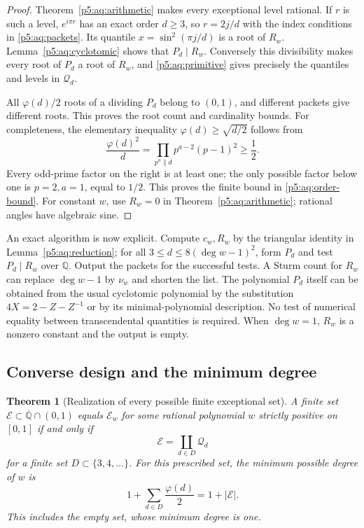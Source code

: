 \documentclass[11pt,a4paper]{article}
\newtheorem{theorem}{Theorem}[section]
\theoremstyle{definition}
\theoremstyle{remark}
\numberwithin{equation}{section}
\begin{document}
\begin{proof}
Theorem~\ref{p5:aq:arithmetic} makes every exceptional level rational.
If $r$ is such a level, $e^{i\pi r}$ has an exact order
$d\ge3$, so $r=2j/d$ with the index conditions in
\eqref{p5:aq:packets}. Its quantile
$x=\sin^2(\pi j/d)$ is a root of $R_w$.
Lemma~\ref{p5:aq:cyclotomic} shows that $P_d\mid R_w$.
Conversely this divisibility makes every root of $P_d$
a root of $R_w$, and \eqref{p5:aq:primitive} gives precisely
the quantiles and levels in $\mathcal Q_d$.

All $\varphi(d)/2$ roots of a dividing $P_d$ belong to $(0,1)$,
and different packets give different roots. This proves the
root count and cardinality bounds.
For completeness, the elementary inequality
$\varphi(d)\ge\sqrt{d/2}$ follows from
\[
 \frac{\varphi(d)^2}{d}
   =\prod_{p^a\parallel d}p^{a-2}(p-1)^2\ge\frac12.
\]
Every odd-prime factor on the right is at least one; the only
possible factor below one is $p=2,a=1$, equal to $1/2$.
This proves the finite bound in \eqref{p5:aq:order-bound}.
For constant $w$, use $R_w=0$ in
Theorem~\ref{p5:aq:arithmetic}; rational angles have algebraic sine.
\end{proof}

An exact algorithm is now explicit. Compute $c_w,R_w$ by the
triangular identity in Lemma~\ref{p5:aq:reduction}; for all
$3\le d\le8(\deg w-1)^2$, form $P_d$ and test
$P_d\mid R_w$ over $\mathbb Q$. Output the packets for the
successful tests. A Sturm count for $R_w$ can replace
$\deg w-1$ by $\nu_w$ and shorten the list.
The polynomial $P_d$ itself can be obtained from the usual
cyclotomic polynomial by the substitution
$4X=2-Z-Z^{-1}$ or by its minimal-polynomial description.
No test of numerical equality between transcendental quantities
is required. When $\deg w=1$, $R_w$ is a nonzero constant
and the output is empty.

\subsection{Converse design and the minimum degree}

\begin{theorem}[Realization of every possible finite exceptional set]
\label{p5:aq:design}
A finite set $\mathcal E\subset\overline{\mathbb Q}\cap(0,1)$
equals $\mathcal E_w$ for some rational polynomial $w$ strictly
positive on $[0,1]$ if and only if
\[
 \mathcal E=\coprod_{d\in D}\mathcal Q_d
\]
for a finite set $D\subset\{3,4,\ldots\}$.
For this prescribed set, the minimum possible degree of $w$ is
\begin{equation}\label{p5:aq:min-degree}
 1+\sum_{d\in D}\frac{\varphi(d)}2
       =1+|\mathcal E|.
\end{equation}
This includes the empty set, whose minimum degree is one.
\end{theorem}
\end{document}
